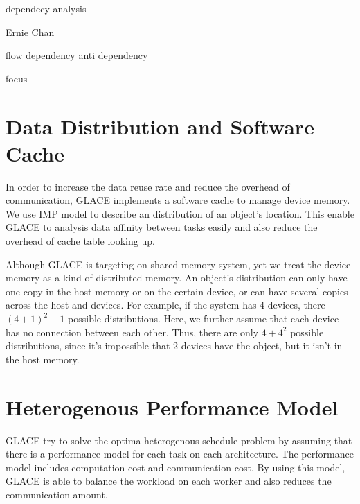\documentclass[preprint,11pt]{elsarticle}
\begin{document}


  dependecy analysis


  Ernie Chan


  flow dependency
  anti dependency


  focus











\section{Data Distribution and Software Cache}
  In order to increase the data reuse rate and reduce the overhead of communication, GLACE
  implements a software cache to manage device memory. We use IMP model \cite{} to 
  describe an distribution of an object's location. This enable GLACE to analysis data affinity
  between tasks easily and also reduce the overhead of cache table looking up.
  
  Although GLACE is targeting on shared memory system, yet we treat the device memory
  as a kind of distributed memory. An object's distribution can only have one copy in the 
  host memory or on the certain device, or can have several copies across the host and
  devices. For example, if the system has 4 devices, there $(4+1)^2 - 1$ possible distributions.
  Here, we further assume that each device has no connection between each other. Thus,
  there are only $4 + 4^2$ possible distributions, since it's impossible that 2 devices have 
  the object, but it isn't in the host memory. 
    
\section{Heterogenous Performance Model}
  GLACE try to solve the optima heterogenous schedule problem by assuming that there is 
  a performance model for each task on each architecture. The performance model includes
  computation cost and communication cost. By using this model, GLACE is able to balance
  the workload on each worker and also reduces the communication amount.  
\end{document}
